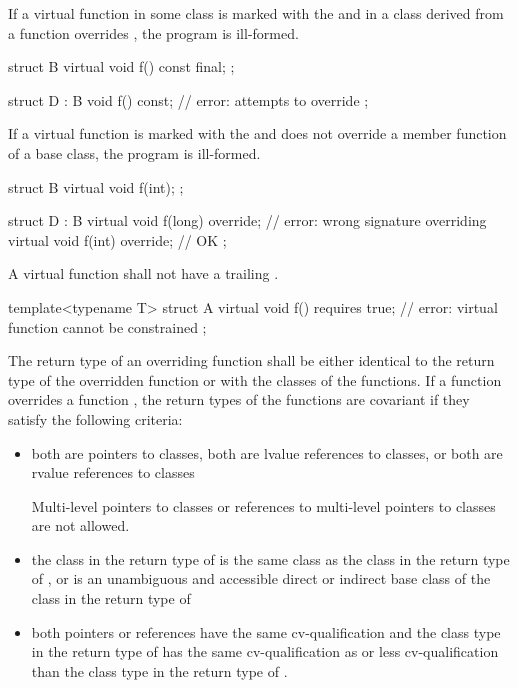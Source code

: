 \pnum
If a virtual function  in some class  is marked with the
  and in a class  derived from 
a function  overrides , the program is ill-formed.
\begin{example}
\begin{codeblock}
struct B {
  virtual void f() const final;
};

struct D : B {
  void f() const;   // error:  attempts to override  
};
\end{codeblock}
\end{example}

\pnum
If a virtual function is marked with the   and
does not override a member function of a base class, the program is ill-formed.
\begin{example}
\begin{codeblock}
struct B {
  virtual void f(int);
};

struct D : B {
  virtual void f(long) override;        // error: wrong signature overriding 
  virtual void f(int) override;         // OK
};
\end{codeblock}
\end{example}

\pnum
A virtual function shall not have a trailing .
\begin{example}
\begin{codeblock}
template<typename T>
struct A {
  virtual void f() requires true;       // error: virtual function cannot be constrained
};
\end{codeblock}
\end{example}

\pnum
The return type of an overriding function shall be either identical to
the return type of the overridden function or  with
the classes of the functions. If a function  overrides a
function , the return types of the functions are covariant
if they satisfy the following criteria:
\begin{itemize}
\item both are pointers to classes, both are lvalue references to
classes, or both are rvalue references to classes
\begin{footnote}
Multi-level pointers to classes or references to multi-level pointers to
classes are not allowed.%
\end{footnote}

\item the class in the return type of  is the same class as
the class in the return type of , or is an unambiguous and
accessible direct or indirect base class of the class in the return type
of 

\item both pointers or references have the same cv-qualification and the
class type in the return type of  has the same
cv-qualification as or less cv-qualification than the class type in the
return type of .
\end{itemize}

